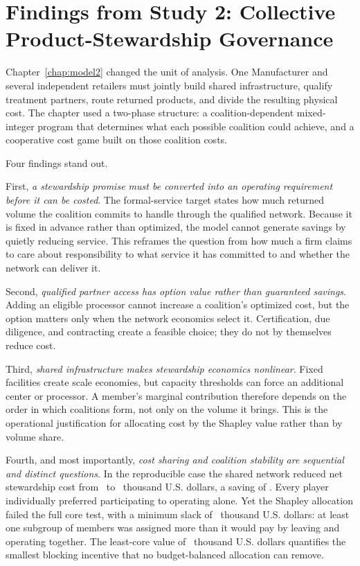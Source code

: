 \section{Findings from Study 2: Collective Product-Stewardship Governance}
\label{sec:ch5_study2}

Chapter~\ref{chap:model2} changed the unit of analysis. One Manufacturer and several independent retailers must jointly build shared infrastructure, qualify treatment partners, route returned products, and divide the resulting physical cost. The chapter used a two-phase structure: a coalition-dependent mixed-integer program that determines what each possible coalition could achieve, and a cooperative cost game built on those coalition costs.

Four findings stand out.

First, \emph{a stewardship promise must be converted into an operating requirement before it can be costed}. The formal-service target states how much returned volume the coalition commits to handle through the qualified network. Because it is fixed in advance rather than optimized, the model cannot generate savings by quietly reducing service. This reframes the question from how much a firm claims to care about responsibility to what service it has committed to and whether the network can deliver it.

Second, \emph{qualified partner access has option value rather than guaranteed savings}. Adding an eligible processor cannot increase a coalition's optimized cost, but the option matters only when the network economics select it. Certification, due diligence, and contracting create a feasible choice; they do not by themselves reduce cost.

Third, \emph{shared infrastructure makes stewardship economics nonlinear}. Fixed facilities create scale economies, but capacity thresholds can force an additional center or processor. A member's marginal contribution therefore depends on the order in which coalitions form, not only on the volume it brings. This is the operational justification for allocating cost by the Shapley value rather than by volume share.

Fourth, and most importantly, \emph{cost sharing and coalition stability are sequential and distinct questions}. In the reproducible case the shared network reduced net stewardship cost from \ChFourStandaloneTotal\ to \ChFourGrandCost\ thousand U.S. dollars, a saving of \ChFourSavingsPercent. Every player individually preferred participating to operating alone. Yet the Shapley allocation failed the full core test, with a minimum slack of \ChFourMinSlack\ thousand U.S. dollars: at least one subgroup of members was assigned more than it would pay by leaving and operating together. The least-core value of \ChFourLeastCoreEpsilon\ thousand U.S. dollars quantifies the smallest blocking incentive that no budget-balanced allocation can remove.

